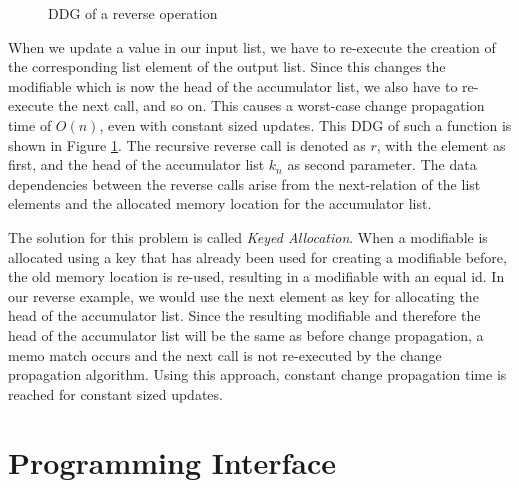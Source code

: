 \begin{figure}
\begin{center}
\end{center}
\caption{DDG of a reverse operation}
\label{fig:reverse_ddg}
\end{figure}

When we update a value in our input list, we have to re-execute the creation of the corresponding list element of the output list. Since this changes the modifiable which is now the head of the accumulator list, we also have to re-execute the next call, and so on. This causes a worst-case change propagation time of $O(n)$, even with constant sized updates. This DDG of such a function is shown in Figure \ref{fig:reverse_ddg}. The recursive reverse call is denoted as $r$, with the element as first, and the head of the accumulator list $k_n$ as second parameter. The data dependencies between the reverse calls arise from the next-relation of the list elements and the allocated memory location for the accumulator list. 

The solution for this problem is called \textit{Keyed Allocation}. When a modifiable is allocated using a key that has already been used for creating a modifiable before, the old memory location is re-used, resulting in a modifiable with an equal id. In our reverse example, we would use the next element as key for allocating the head of the accumulator list. Since the resulting modifiable and therefore the head of the accumulator list will be the same as before change propagation, a memo match occurs and the next call is not re-executed by the change propagation algorithm. Using this approach, constant change propagation time is reached for constant sized updates. 

\section{Programming Interface}

